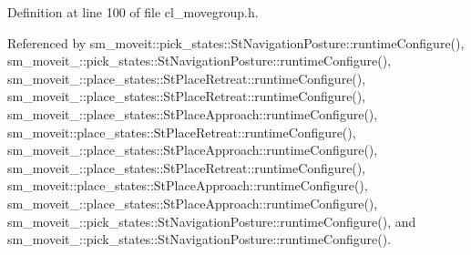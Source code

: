 Definition at line 100 of file cl\+\_\+movegroup.\+h.



Referenced by sm\+\_\+moveit\+::pick\+\_\+states\+::\+St\+Navigation\+Posture\+::runtime\+Configure(), sm\+\_\+moveit\+\_\+::pick\+\_\+states\+::\+St\+Navigation\+Posture\+::runtime\+Configure(), sm\+\_\+moveit\+\_\+::place\+\_\+states\+::\+St\+Place\+Retreat\+::runtime\+Configure(), sm\+\_\+moveit\+\_\+::place\+\_\+states\+::\+St\+Place\+Retreat\+::runtime\+Configure(), sm\+\_\+moveit\+\_\+::place\+\_\+states\+::\+St\+Place\+Approach\+::runtime\+Configure(), sm\+\_\+moveit\+::place\+\_\+states\+::\+St\+Place\+Retreat\+::runtime\+Configure(), sm\+\_\+moveit\+\_\+::place\+\_\+states\+::\+St\+Place\+Approach\+::runtime\+Configure(), sm\+\_\+moveit\+\_\+::place\+\_\+states\+::\+St\+Place\+Retreat\+::runtime\+Configure(), sm\+\_\+moveit\+::place\+\_\+states\+::\+St\+Place\+Approach\+::runtime\+Configure(), sm\+\_\+moveit\+\_\+::place\+\_\+states\+::\+St\+Place\+Approach\+::runtime\+Configure(), sm\+\_\+moveit\+\_\+::pick\+\_\+states\+::\+St\+Navigation\+Posture\+::runtime\+Configure(), and sm\+\_\+moveit\+\_\+::pick\+\_\+states\+::\+St\+Navigation\+Posture\+::runtime\+Configure().


